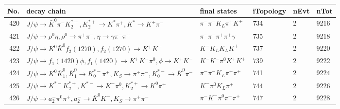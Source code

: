 \begin{table}[htbp] 
\begin{center}
\begin{small}
\begin{tabular}{rlllll}\hline\hline
 No. & decay chain & final states &  iTopology & nEvt & nTot \\\hline
420&$J/\psi       \rightarrow \bar{K}^{0}   \pi^{-}        K_2^{*+}       , K_2^{*+}        \rightarrow K^{*}          \pi^{+}        , K^{*}           \rightarrow K^{+}          \pi^{-}        $&$\pi^{-}        \pi^{-}        K_{L}          \pi^{+}        K^{+}          $&  734&    2& 9216\\
421&$J/\psi       \rightarrow \rho^{0}      \eta          , \rho^{0}       \rightarrow \pi^{+}        \pi^{-}        , \eta           \rightarrow \gamma       \pi^{-}        \pi^{+}        $&$\pi^{-}        \pi^{-}        \pi^{+}        \pi^{+}        \gamma       $&  735&    2& 9218\\
422&$J/\psi       \rightarrow K^{0}          \bar{K}^{0}   f_{2}(1270)    , f_{2}(1270)     \rightarrow K^{+}          K^{-}          $&$K^{-}          K_{L}          K_{L}          K^{+}          $&  737&    2& 9220\\
423&$J/\psi       \rightarrow f_{1}(1420)    \phi           , f_{1}(1420)     \rightarrow K^{+}          K^{-}          \pi^{0}        , \phi            \rightarrow K^{+}          K^{-}          $&$K^{-}          K^{-}          \pi^{0}        K^{+}          K^{+}          $&  739&    2& 9222\\
424&$J/\psi       \rightarrow K^{0}          \bar{K}_1^{0} , \bar{K}_1^{0}  \rightarrow K_{0}^{*-}     \pi^{+}        , K_{S}           \rightarrow \pi^{+}        \pi^{-}        , K_{0}^{*-}      \rightarrow \bar{K}^{0}   \pi^{-}        $&$\pi^{-}        \pi^{-}        K_{L}          \pi^{+}        \pi^{+}        $&  741&    2& 9224\\
425&$J/\psi       \rightarrow K^{*-}         K_2^{*+}       , K^{*-}          \rightarrow K^{-}          \pi^{0}        , K_2^{*+}        \rightarrow K^{0}          \pi^{+}        $&$K^{-}          \pi^{0}        K_{L}          \pi^{+}        $&  744&    2& 9226\\
426&$J/\psi       \rightarrow a_{2}^{-}      \pi^{0}        \pi^{+}        , a_{2}^{-}       \rightarrow \bar{K}^{0}   K^{-}          , K_{S}           \rightarrow \pi^{+}        \pi^{-}        $&$\pi^{-}        K^{-}          \pi^{0}        \pi^{+}        \pi^{+}        $&  747&    2& 9228\\

\end{tabular}
\end{small}
\end{center}
\end{table}
